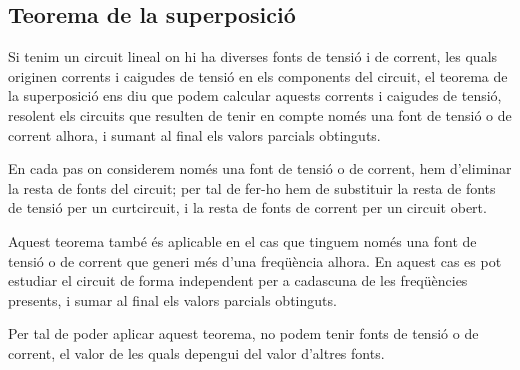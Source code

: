 \subsection{Teorema de la superposició}

Si tenim un circuit lineal on hi ha diverses fonts de tensió i  de
corrent, les quals originen corrents i caigudes de tensió en els
components del circuit, el teorema de la superposició ens diu que
podem calcular aquests corrents i caigudes de tensió, resolent els
circuits que resulten de tenir en compte  només una font de tensió o
de corrent alhora, i sumant al final els valors parcials
obtinguts.

En cada pas on considerem només una font de tensió o de corrent, hem
d'eliminar la resta de fonts del circuit; per tal de fer-ho hem de
substituir la resta de fonts de tensió per un curtcircuit, i la
resta de fonts de corrent per un circuit obert.

Aquest teorema també és aplicable en el cas que tinguem només una
font de tensió o de corrent que generi més d'una freqüència alhora. En aquest cas es pot estudiar el circuit de forma
independent per a cadascuna de les freqüències presents, i sumar al final els valors parcials obtinguts.

Per tal de poder aplicar aquest teorema, no podem tenir fonts de tensió o de corrent, el valor de les quals depengui del valor d'altres fonts.

